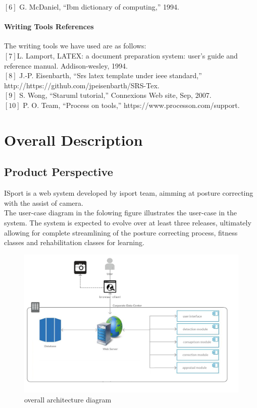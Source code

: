 \documentclass[16pt]{scrreprt}
\begin{document}
$[6]$ G. McDaniel, “Ibm dictionary of computing,” 1994.
\subsubsection{Writing Tools References}
The writing tools we have used are as follows:\\

$[7]$L. Lamport, LATEX: a document preparation system: user’s guide and reference manual. Addison-wesley, 1994.\\

$[8]$ J.-P. Eisenbarth, “Srs latex template under ieee standard,” \\http://https://github.com/jpeisenbarth/SRS-Tex.\\

$[9]$ S. Wong, “Staruml tutorial,” Connexions Web site, Sep, 2007.\\

$[10]$ P. O. Team, “Process on tools,” https://www.processon.com/support.

\chapter{Overall Description}
\label{Overall Description}

\section{Product Perspective}

ISport is a web system developed by isport team, aimming at posture correcting with the assist of camera.\\

The user-case diagram in the folowing figure illustrates the user-case in the system. The system is expected to evolve over at least three releases, ultimately allowing for complete streamlining of the posture correcting process, fitness classes and rehabilitation classes for learning.

\begin{figure}[H]
	\centering
	\includegraphics[width=1.0\textwidth]{figures/architecturediagram.png}
	\caption{overall architecture diagram}
\end{figure}
\end{document}
